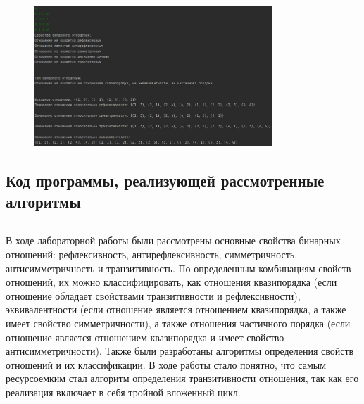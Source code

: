 \documentclass[bachelor, och, labwork]{shiza}
\begin{document}
        \begin{figure}[H]
            \centering
            \includegraphics[width=0.8\textwidth]{pic/1.jpg}
            \caption{}
        \end{figure}
    
    \subsection{Код программы, реализующей рассмотренные алгоритмы}
    
        \inputminted[linenos,breaklines=true, fontsize=\small, style=bw]{python}{code/lab1.py}

\conclusion
В ходе лабораторной работы были рассмотрены основные свойства бинарных отношений:
рефлексивность, антирефлексивность, симметричность, антисимметричность и 
транзитивность. По определенным комбинациям свойств отношений, их можно 
классифицировать, как отношения квазипорядка (если отношение обладает 
свойствами транзитивности и рефлексивности), эквивалентности (если отношение 
является отношением квазипорядка, а также имеет свойство симметричности), а 
также отношения частичного порядка (если отношение является отношением 
квазипорядка и имеет свойство антисимметричности). Также были разработаны 
алгоритмы определения свойств отношений и их классификации. В ходе работы стало 
понятно, что самым ресурсоемким стал алгоритм определения транзитивности 
отношения, так как его реализация включает в себя тройной вложенный цикл.
\end{document}
